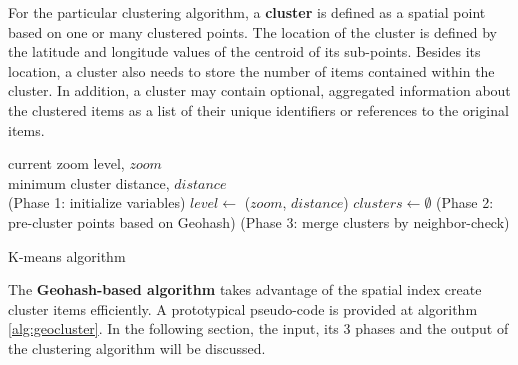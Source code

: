 For the particular clustering algorithm, a \textbf{cluster} is defined as a spatial point based on one or many clustered points. The location of the cluster is defined by the latitude and longitude values of the centroid of its sub-points. Besides its location, a cluster also needs to store the number of items contained within the cluster. In addition, a cluster may contain optional, aggregated information about the clustered items as a list of their unique identifiers or references to the original items.      

\newlength{}
\newcommand\myinput[1]{%
  \settowidth\inputlen{\KwIn{}}%
  \setlength\hangindent{\inputlen}%
  \hspace*{\inputlen}#1\\}

\begin{algorithm}[t]
  \myinput{current zoom level, $zoom$}
  \myinput{minimum cluster distance, $distance$}
  \BlankLine
  \Begin(Phase 1: initialize variables){
  	$level \leftarrow$ \getClusterLevel($zoom$, $distance$)\;
  	$clusters \leftarrow \emptyset$\;
  }
  \Begin(Phase 2: pre-cluster points based on Geohash){
  }
  \Begin(Phase 3: merge clusters by neighbor-check){
  }
  \BlankLine

  \caption{K-means algorithm~\cite{Meert06clustermaps}}
  \label{alg:geocluster}
\end{algorithm}

The \textbf{Geohash-based algorithm} takes advantage of the spatial index create cluster items efficiently. A prototypical pseudo-code is provided at algorithm \ref{alg:geocluster}. In the following section, the input, its 3 phases and the output of the clustering algorithm will be discussed.


